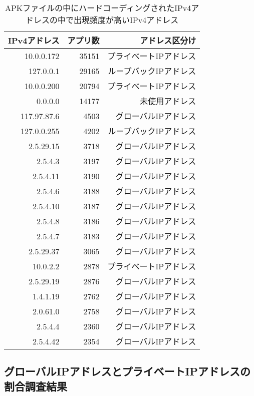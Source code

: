 \documentclass[a4j]{jarticle}
\begin{document}
\begin{table}[htb]
  \begin{center}
    \caption{APKファイルの中にハードコーディングされたIPv4アドレスの中で出現頻度が高いIPv4アドレス}
    \begin{tabular}{|r|r|r|} \hline
      IPv4アドレス & アプリ数 & アドレス区分け\\ \hline \hline
10.0.0.172 & 35151 &プライベートIPアドレス\\ \hline
127.0.0.1 & 29165& ループバックIPアドレス\\ \hline
10.0.0.200 & 20794 & プライベートIPアドレス\\ \hline
0.0.0.0 & 14177 &　未使用アドレス\\ \hline
117.97.87.6 & 4503 & グローバルIPアドレス\\ \hline
127.0.0.255 & 4202 & ループバックIPアドレス\\ \hline
2.5.29.15 & 3718 & グローバルIPアドレス\\ \hline
2.5.4.3 & 3197 & グローバルIPアドレス\\ \hline
2.5.4.11 & 3190&　グローバルIPアドレス \\ \hline
2.5.4.6 & 3188 & グローバルIPアドレス\\ \hline
2.5.4.10 & 3187 & グローバルIPアドレス\\ \hline
2.5.4.8 & 3186 & グローバルIPアドレス\\ \hline
2.5.4.7 & 3183 & グローバルIPアドレス\\ \hline
2.5.29.37 & 3065 & グローバルIPアドレス\\ \hline
10.0.2.2 & 2878 & プライベートIPアドレス\\ \hline
2.5.29.19 & 2876& グローバルIPアドレス \\ \hline
1.4.1.19 & 2762 & グローバルIPアドレス\\ \hline
2.0.61.0 & 2758 & グローバルIPアドレス\\ \hline
2.5.4.4 & 2360 & グローバルIPアドレス\\ \hline
2.5.4.42 & 2354 & グローバルIPアドレス\\ \hline
    \end{tabular}
    \label{tab:price}
  \end{center}
\end{table}

\newpage

\subsection{グローバルIPアドレスとプライベートIPアドレスの割合調査結果}
\end{document}
